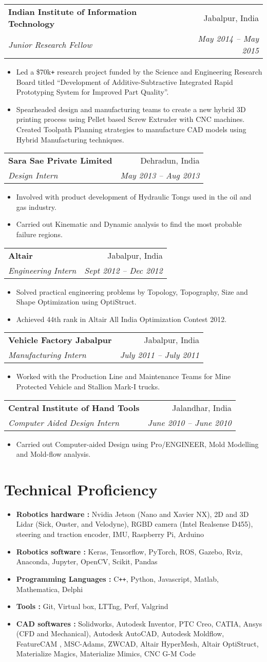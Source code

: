 \documentclass[letterpaper,10pt]{article}
\makeatletter
\newcommand{\resumeHeading}[4]{
  \vspace{-1pt}
    \begin{tabular*}{0.97\textwidth}{l@{\extracolsep{\fill}}r}
      \textbf{#1} & #2 \vspace{-2pt}\\ \vspace{1pt}
      \textit{\small#3} & \textit{\small #4} \\
    \end{tabular*}
}
\newcommand{\resumeSection}[1]{
\vspace{-12pt}
\section{\textbf{#1}}
}
\newcommand{\resumeItemListStart}{
\vspace{-7pt}
\begin{itemize}[leftmargin=14pt]
}
\newcommand{\resumeItemListEnd}{
\vspace{+7pt}
\end{itemize}
}
\newcommand{\resumeItem}[1]{
  \item\small{
      {#1 \vspace{-7pt}
      }
  }
}
\makeatother
\begin{document}
\resumeHeading
{Indian Institute of Information Technology}{Jabalpur, India}
{Junior Research Fellow}{May 2014 -- May 2015}
\resumeItemListStart
\resumeItem{Led a \$70k\texttt{+} research project funded by the Science and Engineering Research Board titled “Development of Additive-Subtractive Integrated Rapid Prototyping System for Improved Part Quality”.}
\resumeItem{Spearheaded design and manufacturing teams to create a new hybrid 3D printing process using Pellet based Screw Extruder with CNC machines. Created Toolpath Planning strategies to manufacture CAD models using Hybrid Manufacturing techniques.}
\resumeItemListEnd

\resumeHeading
{Sara Sae Private Limited}{Dehradun, India}
{Design Intern}{May 2013 -- Aug 2013}
\resumeItemListStart
\resumeItem{Involved with product development of Hydraulic Tongs used in the oil and gas industry.}
\resumeItem{Carried out Kinematic and Dynamic analysis to find the most probable failure regions.}
\resumeItemListEnd

\resumeHeading
{Altair}{Jabalpur, India}
{Engineering Intern}{Sept 2012 -- Dec 2012}
\resumeItemListStart
\resumeItem{Solved practical engineering problems by Topology, Topography, Size and Shape Optimization using OptiStruct. }
\resumeItem{Achieved 44th rank in Altair All India Optimization Contest 2012.}
\resumeItemListEnd

\resumeHeading
{Vehicle Factory Jabalpur}{Jabalpur, India}
{Manufacturing Intern}{July 2011 -- July 2011}
\resumeItemListStart
\resumeItem{Worked with the Production Line and Maintenance Teams for Mine Protected Vehicle and Stallion Mark-I trucks.}
\resumeItemListEnd

\resumeHeading
{Central Institute of Hand Tools}{Jalandhar, India}
{Computer Aided Design Intern}{June 2010 -- June 2010}
\resumeItemListStart
\resumeItem{Carried out Computer-aided Design using Pro/ENGINEER, Mold Modelling and Mold-flow analysis.}
\resumeItemListEnd



\resumeSection{Technical Proficiency}
    \vspace{+7pt}
    \resumeItemListStart
    \resumeItem{\textbf{Robotics hardware :}  Nvidia Jetson (Nano and Xavier NX), 2D and 3D Lidar (Sick, Ouster, and Velodyne), RGBD camera (Intel Realsense D455), steering and traction encoder, IMU, Raspberry Pi, Arduino}
    \resumeItem{\textbf{Robotics software :} Keras, Tensorflow, PyTorch, ROS, Gazebo, Rviz, Anaconda, Jupyter, OpenCV, Scikit, Pandas}
    \resumeItem{\textbf{Programming Languages :} C\texttt{++}, Python, Javascript, Matlab, Mathematica, Delphi}
    \resumeItem{\textbf{Tools :} Git, Virtual box, LTTng, Perf, Valgrind}
    \resumeItem{\textbf{CAD softwares :} Solidworks, Autodesk Inventor, PTC Creo, CATIA, Ansys (CFD and Mechanical), Autodesk AutoCAD, Autodesk Moldflow, FeatureCAM , MSC-Adams, ZWCAD, Altair HyperMesh, Altair OptiStruct, Materialize Magics, Materialize Mimics, CNC G-M Code}
    \resumeItemListEnd
\end{document}
